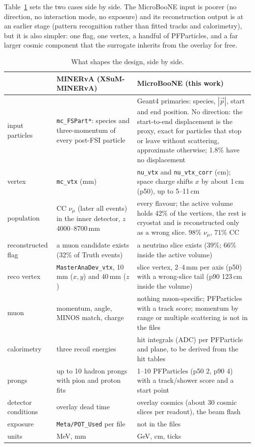 \documentclass[10pt,letterpaper]{article}
\newcommand{\code}[1]{\texttt{#1}}
\newcommand{\pct}[1]{#1\%}
\begin{document}
Table~\ref{tab:diff} sets the two cases side by side. The MicroBooNE input is poorer (no direction, no interaction
mode, no exposure) and its reconstruction output is at an earlier stage (pattern recognition rather than fitted tracks
and calorimetry), but it is also simpler: one flag, one vertex, a handful of PFParticles, and a far larger cosmic
component that the surrogate inherits from the overlay for free.

\begin{table}[H]\centering\footnotesize
\caption{What shapes the design, side by side.}\label{tab:diff}
\begin{tabular}{@{}p{24mm}p{58mm}p{80mm}@{}}\toprule
 & MINERvA (XSuM-MINERvA) & MicroBooNE (this work)\\ \midrule
input particles & \code{mc\_FSPart*}: species and three-momentum of every post-FSI particle & Geant4 primaries: species, $|\vec p|$, start and end position. No direction: the start-to-end displacement is the proxy, exact for particles that stop or leave without scattering, approximate otherwise; \pct{1.8} have no displacement\\
vertex & \code{mc\_vtx} (mm) & \code{nu\_vtx} and \code{nu\_vtx\_corr} (cm); space charge shifts $x$ by about 1\,cm (p50), up to 5--11\,cm\\
population & CC $\nu_\mu$ (later all events) in the inner detector, $z$ 4000--8700\,mm & every flavour; the active volume holds \pct{42} of the vertices, the rest is cryostat and is reconstructed only as a wrong slice. \pct{98} $\nu_\mu$, \pct{71} CC\\
reconstructed flag & a muon candidate exists (\pct{32} of Truth events) & a neutrino slice exists (\pct{39}; \pct{66} inside the active volume)\\
reco vertex & \code{MasterAnaDev\_vtx}, 10\,mm ($x,y$) and 40\,mm ($z$) & slice vertex, 2--4\,mm per axis (p50) with a wrong-slice tail (p90 123\,cm inside the volume)\\
muon & momentum, angle, MINOS match, charge & nothing muon-specific; PFParticles with a track score; momentum by range or multiple scattering is not in the files\\
calorimetry & three recoil energies & hit integrals (ADC) per PFParticle and plane, to be derived from the hit tables\\
prongs & up to 10 hadron prongs with pion and proton fits & 1--10 PFParticles (p50 2, p90 4) with a track/shower score and a start point\\
detector conditions & overlay dead time & overlay cosmics (about 30 cosmic slices per readout), the beam flash\\
exposure & \code{Meta/POT\_Used} per file & not in the files\\
units & MeV, mm & GeV, cm, ticks\\
\bottomrule\end{tabular}
\end{table}
\end{document}
